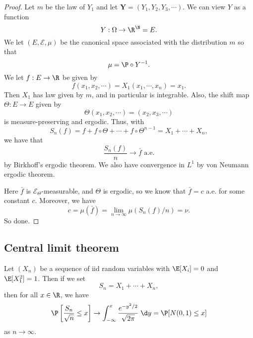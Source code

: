 \documentclass[a4paper]{article}
\begin{document}
\begin{proof}
  Let $m$ be the law of $Y_1$ and let $\mathbf{Y} = (Y_1, Y_2, Y_3, \cdots)$. We can view $Y$ as a function
  \[
    Y: \Omega \to \R^\N = E.
  \]
  We let $(E, \mathcal{E}, \mu)$ be the canonical space associated with the distribution $m$ so that
  \[
    \mu = \P \circ Y^{-1}.
  \]
  We let $f: E \to \R$ be given by
  \[
    f(x_1, x_2, \cdots) = X_1(x_1, \cdots, x_n) = x_1.
  \]
  Then $X_1$ has law given by $m$, and in particular is integrable. Also, the shift map $\Theta: E \to E$ given by
  \[
    \Theta(x_1, x_2, \cdots) = (x_2, x_3, \cdots)
  \]
  is measure-preserving and ergodic. Thus, with
  \[
    S_n(f) = f + f \circ \Theta + \cdots + f \circ \Theta^{n - 1} = X_1 + \cdots + X_n,
  \]
  we have that
  \[
    \frac{S_n(f)}{n} \to \bar{f}\text{ a.e.}
  \]
  by Birkhoff's ergodic theorem. We also have convergence in $L^1$ by von Neumann ergodic theorem.

  Here $\bar{f}$ is $\mathcal{E}_\Theta$-measurable, and $\Theta$ is ergodic, so we know that $\bar{f} = c$ a.e. for some constant $c$. Moreover, we have
  \[
    c = \mu(\bar{f}) = \lim_{n \to \infty} \mu(S_n(f)/n) = \nu.
  \]
  So done.
\end{proof}

\subsection{Central limit theorem}
\begin{thm}
  Let $(X_n)$ be a sequence of iid random variables with $\E[X_i] = 0$ and $\E[X_1^2] = 1$. Then if we set
  \[
    S_n = X_1 + \cdots + X_n,
  \]
  then for all $x \in \R$, we have
  \[
    \P\left[ \frac{S_n}{\sqrt{n}} \leq x\right] \to \int_{-\infty}^x \frac{e^{-y^2/2}}{\sqrt{2\pi}}\;\d y = \P[N(0, 1) \leq x]
  \]
  as $n \to \infty$.
\end{thm}
\end{document}
